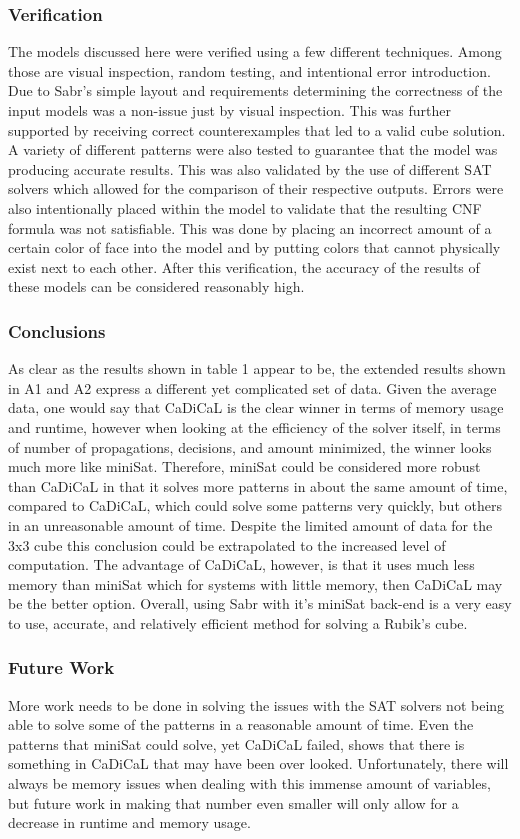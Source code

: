 \documentclass{article}
\begin{document}
\subsubsection{Verification}
The models discussed here were verified using a few different techniques. Among those are visual inspection, random testing, and intentional error introduction. Due to Sabr's simple layout and requirements determining the correctness of the input models was a non-issue just by visual inspection. This was further supported by receiving correct counterexamples that led to a valid cube solution. A variety of different patterns were also tested to guarantee that the model was producing accurate results. This was also validated by the use of different SAT solvers which allowed for the comparison of their respective outputs. Errors were also intentionally placed within the model to validate that the resulting CNF formula was not satisfiable. This was done by placing an incorrect amount of a certain color of face into the model and by putting colors that cannot physically exist next to each other. After this verification, the accuracy of the results of these models can be considered reasonably high.
\subsubsection{Conclusions}
As clear as the results shown in table 1 appear to be, the extended results shown in A1 and A2 express a different yet complicated set of data. Given the average data, one would say that CaDiCaL is the clear winner in terms of memory usage and runtime, however when looking at the efficiency of the solver itself, in terms of number of propagations, decisions, and amount minimized, the winner looks much more like miniSat. Therefore, miniSat could be considered more robust than CaDiCaL in that it solves more patterns in about the same amount of time, compared to CaDiCaL, which could solve some patterns very quickly, but others in an unreasonable amount of time. Despite the limited amount of data for the 3x3 cube this conclusion could be extrapolated to the increased level of computation. The advantage of CaDiCaL, however, is that it uses much less memory than miniSat which for systems with little memory, then CaDiCaL may be the better option. Overall, using Sabr with it's miniSat back-end is a very easy to use, accurate, and relatively efficient method for solving a Rubik's cube.
\subsubsection{Future Work}
More work needs to be done in solving the issues with the SAT solvers not being able to solve some of the patterns in a reasonable amount of time. Even the patterns that miniSat could solve, yet CaDiCaL failed, shows that there is something in CaDiCaL that may have been over looked. Unfortunately, there will always be memory issues when dealing with this immense amount of variables, but future work in making that number even smaller will only allow for a decrease in runtime and memory usage.
\end{document}
